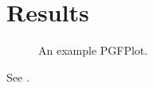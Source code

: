 \section{Results}
\label{sec:results}

\begin{figure}
  \centerline{}
  \caption{An example PGFPlot.}
  \label{fig:results:main}
\end{figure}

See .
